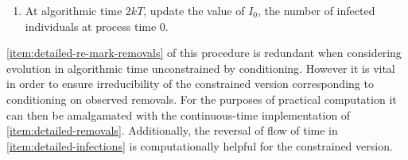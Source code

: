 \documentclass[]{article}
\newcommand{\Poisson}{\Pi}
\newcommand{\PoissonInf}{\Poisson^\textup{inf}}
\begin{document}
\begin{defn}
\begin{enumerate}
\((0,T{-}t)\).
Thus at algorithmic time \((2k{-}1)T+t\) (for \(0\leq t<T\)) the set of potential infection incidents is
\begin{align*}
\PoissonInf_{k-1}[0,T{-}t) &\cup \PoissonInf_k[T{-}t,T] \quad = \quad
\{[s;\cdot,\cdot]\in\Poisson_{k-1}: 0\leq s< T{-}t\}
\cup
\{[s;\cdot,\cdot]\in\Poisson_k: T{-}t \leq s\leq T\}
\,.
\end{align*}
By algorithmic time \(2kT\) all old
potential infection incidents will have been replaced by a new set of
potential infection incidents, 
all
independently marked by unordered pairs 
of time-lines.
(Again we omit consideration 
of infections occurring exactly at process times \(0\) and \(T\);
almost surely potential infections avoid pre-specified times.)
\item\label{item:detailed-initial}
At algorithmic time \(2kT\), update the value of \(I_0\), the number of infected individuals at process time \(0\).
\end{enumerate}
\end{defn}

\ref{item:detailed-re-mark-removals}
of this procedure
is redundant when considering evolution in algorithmic time unconstrained
by conditioning. 
However it is vital in order to ensure irreducibility of the constrained version
corresponding to conditioning on observed removals. 
For the purposes of practical computation
it can then be amalgamated
with the continuous-time implementation of \ref{item:detailed-removals}.
Additionally,
the reversal of flow of time in
\ref{item:detailed-infections} is computationally helpful
for the 
constrained version.
\end{document}
